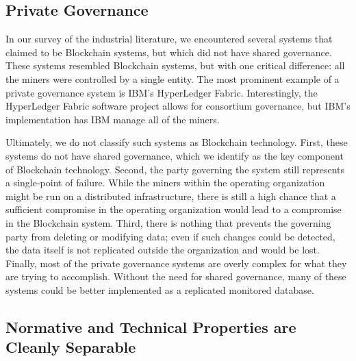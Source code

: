 \subsection{Private Governance}

In our survey of the industrial literature, we encountered several systems that claimed to be Blockchain systems, but which did not have shared governance.
These systems resembled Blockchain systems, but with one critical difference: all the miners were controlled by a single entity.
The most prominent example of a private governance system is IBM's HyperLedger Fabric.
Interestingly, the HyperLedger Fabric software project allows for consortium governance, but IBM's implementation has IBM manage all of the miners.

Ultimately, we do not classify such systems as Blockchain technology.
First, these systems do not have shared governance, which we identify as the key component of Blockchain technology.
Second, the party governing the system still represents a single-point of failure.
While the miners within the operating organization might be run on a distributed infrastructure, there is still a high chance that a sufficient compromise in the operating organization would lead to a compromise in the Blockchain system.
Third, there is nothing that prevents the governing party from deleting or modifying data; even if such changes could be detected, the data itself is not replicated outside the organization and would be lost.
Finally, most of the private governance systems are overly complex for what they are trying to accomplish.
Without the need for shared governance, many of these systems could be better implemented as a replicated monitored database.


\subsection{Normative and Technical Properties are Cleanly Separable}
\label{sec:normative}

